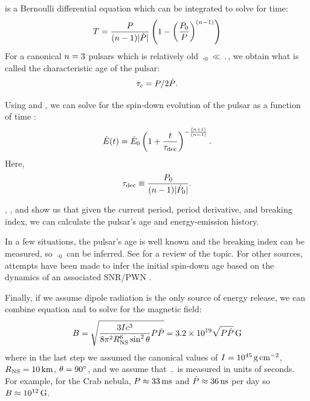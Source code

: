  is a Bernoulli differential
equation which can be integrated to solve for time:
\begin{equation}\eqnlabel{pulsar_age}
  T = \frac{\period}{(\breakingindex-1) \absval{\perioddot}}
  \left(
  1-\left(\frac{\period_0}{\period}\right)^{(\breakingindex-1)}
  \right)
\end{equation}
For a canonical $n=3$ pulsars which is relatively old
$\period_0 \ll \period$, we obtain what is called the characteristic
age of the pulsar:
\begin{equation}
  \tau_c = P/2\dot{P}.
\end{equation}

Using  and ,
we can solve for the spin-down evolution of the pulsar as a function of
time \citep{pacini_1973_evolution-supernova}:
\begin{equation}\eqnlabel{energy_dot_vs_time}
    \energydot(t) = \energydot_0
    \left(
    1 + \frac{\time}{\SpinDownTimescale}
    \right)^{-\frac{(\breakingindex+1)}{(\breakingindex-1)}}.
\end{equation}
Here,
\begin{equation}
  \tau_\text{dec} \equiv \frac{P_0}{(n-1)|\dot{P}_0|}.
\end{equation}

, , and
 show us that given the current period,
period derivative, and breaking index, we can calculate the pulsar's
age and energy-emission history.

In a few situations, the pulsar's age is well known and the
breaking index can be measured, so $\period_0$ can be inferred. See
\cite{kaspi_2002_constraining-birth} for a review of the topic. For
other sources, attempts have been made to infer the initial spin-down
age based on the dynamics of an associated \acs{SNR}/\ac{PWN}
\citep{van-der-swaluw_2001_inferring-initial}.

Finally, if we assume dipole radiation is the only source of energy
release, we can combine equation  and
 to solve for the magnetic field:
\begin{equation}
  B = \sqrt{\frac{3Ic^3}{
  8\pi^2R_\text{NS}^6\sin^2\theta}P\dot{P}}
  = 3.2\times 10^{19} \sqrt{P\dot{P}} \,\text{G}
\end{equation}
where in the last step we assumed the canonical values of
$I=10^{45}\,\text{g}\,\text{cm}^{-2}$,
$R_\text{NS}=10\,\text{km}$, $\theta=90^\circ$, and we
assume that $\period$ is measured in units of seconds.  For example,
for the Crab nebula, $P\approx33\,\text{ms}$
\citep{staelin_1968_pulsating-radio} and
$\dot{P}\approx36\,\text{ns}$
per day \citep{richards_1969a_period-pulsar} so
$B\approx10^{12}\,\text{G}$.
